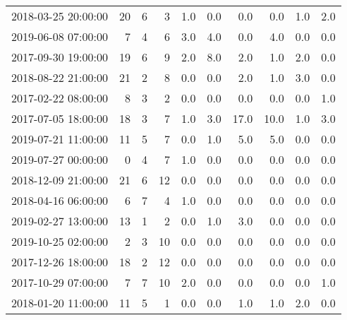 \begin{table}[H]
{\begin{tabular}{lrrrrrrrrr}
2018-03-25 20:00:00 &    20 &            6 &      3 &         1.0 &         0.0 &         0.0 &         0.0 &           1.0 &           2.0 \\
2019-06-08 07:00:00 &     7 &            4 &      6 &         3.0 &         4.0 &         0.0 &         4.0 &           0.0 &           0.0 \\
2017-09-30 19:00:00 &    19 &            6 &      9 &         2.0 &         8.0 &         2.0 &         1.0 &           2.0 &           0.0 \\
2018-08-22 21:00:00 &    21 &            2 &      8 &         0.0 &         0.0 &         2.0 &         1.0 &           3.0 &           0.0 \\
2017-02-22 08:00:00 &     8 &            3 &      2 &         0.0 &         0.0 &         0.0 &         0.0 &           0.0 &           1.0 \\
2017-07-05 18:00:00 &    18 &            3 &      7 &         1.0 &         3.0 &        17.0 &        10.0 &           1.0 &           3.0 \\
2019-07-21 11:00:00 &    11 &            5 &      7 &         0.0 &         1.0 &         5.0 &         5.0 &           0.0 &           0.0 \\
2019-07-27 00:00:00 &     0 &            4 &      7 &         1.0 &         0.0 &         0.0 &         0.0 &           0.0 &           0.0 \\
2018-12-09 21:00:00 &    21 &            6 &     12 &         0.0 &         0.0 &         0.0 &         0.0 &           0.0 &           0.0 \\
2018-04-16 06:00:00 &     6 &            7 &      4 &         1.0 &         0.0 &         0.0 &         0.0 &           0.0 &           0.0 \\
2019-02-27 13:00:00 &    13 &            1 &      2 &         0.0 &         1.0 &         3.0 &         0.0 &           0.0 &           0.0 \\
2019-10-25 02:00:00 &     2 &            3 &     10 &         0.0 &         0.0 &         0.0 &         0.0 &           0.0 &           0.0 \\
2017-12-26 18:00:00 &    18 &            2 &     12 &         0.0 &         0.0 &         0.0 &         0.0 &           0.0 &           0.0 \\
2017-10-29 07:00:00 &     7 &            7 &     10 &         2.0 &         0.0 &         0.0 &         0.0 &           0.0 &           1.0 \\
2018-01-20 11:00:00 &    11 &            5 &      1 &         0.0 &         0.0 &         1.0 &         1.0 &           2.0 &           0.0 \\

\end{tabular}}
\end{table}
